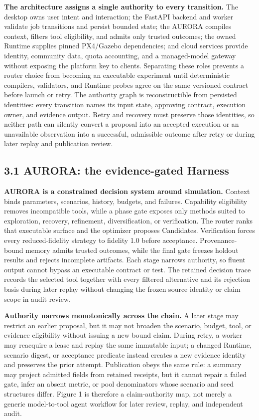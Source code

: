 \textbf{The architecture assigns a single authority to every
transition.} The desktop owns user intent and interaction; the FastAPI
backend and worker validate job transitions and persist bounded state;
the AURORA compiles context, filters tool eligibility, and admits only
trusted outcomes; the owned Runtime supplies pinned PX4/Gazebo
dependencies; and cloud services provide identity, community data, quota
accounting, and a managed-model gateway without exposing the platform
key to clients. Separating these roles prevents a router choice from
becoming an executable experiment until deterministic compilers,
validators, and Runtime probes agree on the same versioned contract
before launch or retry. The authority graph is reconstructible from
persisted identities: every transition names its input state, approving
contract, execution owner, and evidence output. Retry and recovery must
preserve those identities, so neither path can silently convert a proposal
into an accepted execution or an unavailable observation into a
successful, admissible outcome after retry or during later replay and
publication review.

\subsection{\texorpdfstring{\textbf{3.1 AURORA: the evidence-gated
Harness}}{3.1 AURORA: the evidence-gated Harness}}\label{aurora-the-evidence-gated-harness}

\textbf{AURORA is a constrained decision system around simulation.}
Context binds parameters, scenarios, history, budgets, and failures.
Capability eligibility removes incompatible tools, while a phase gate
exposes only methods suited to exploration, recovery, refinement,
diversification, or verification. The router ranks that executable
surface and the optimizer proposes Candidates. Verification forces every
reduced-fidelity strategy to fidelity 1.0 before acceptance.
Provenance-bound memory admits trusted outcomes, while the final gate
freezes holdout results and rejects incomplete artifacts. Each stage
narrows authority, so fluent output cannot bypass an executable contract
or test. The retained decision trace records the selected tool together
with every filtered alternative and its rejection basis during later
replay without changing the frozen source identity or claim scope in
audit review.

\textbf{Authority narrows monotonically across the chain.} A later stage
may restrict an earlier proposal, but it may not broaden the scenario,
budget, tool, or evidence eligibility without issuing a new bound claim.
During retry, a worker may reacquire a lease and replay the same immutable
input; a changed Runtime, scenario digest, or acceptance predicate instead
creates a new evidence identity and preserves the prior attempt. Publication
obeys the same rule: a summary may project admitted fields from retained
receipts, but it cannot repair a failed gate, infer an absent metric, or pool
denominators whose scenario and seed structures differ. Figure 1 is therefore
a claim-authority map, not merely a generic model-to-tool agent workflow for
later review, replay, and independent audit.

